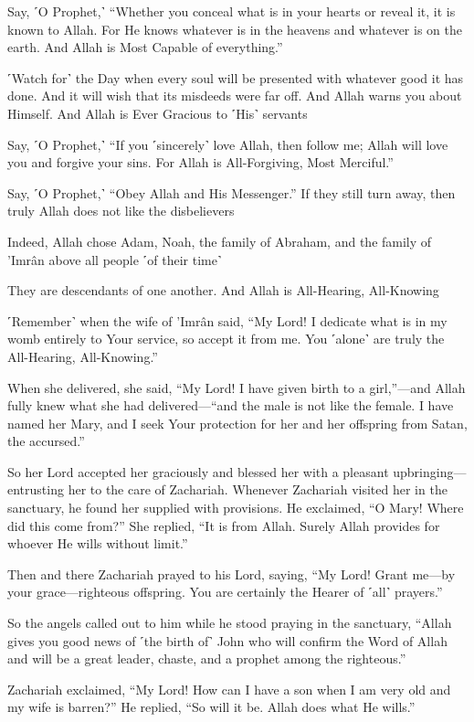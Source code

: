 Say, ˹O Prophet,˺ “Whether you conceal what is in your hearts or reveal it, it is known to Allah. For He knows whatever is in the heavens and whatever is on the earth. And Allah is Most Capable of everything.”

˹Watch for˺ the Day when every soul will be presented with whatever good it has done. And it will wish that its misdeeds were far off. And Allah warns you about Himself. And Allah is Ever Gracious to ˹His˺ servants

Say, ˹O Prophet,˺ “If you ˹sincerely˺ love Allah, then follow me; Allah will love you and forgive your sins. For Allah is All-Forgiving, Most Merciful.”

Say, ˹O Prophet,˺ “Obey Allah and His Messenger.” If they still turn away, then truly Allah does not like the disbelievers

Indeed, Allah chose Adam, Noah, the family of Abraham, and the family of ’Imrân above all people ˹of their time˺

They are descendants of one another. And Allah is All-Hearing, All-Knowing

˹Remember˺ when the wife of ’Imrân said, “My Lord! I dedicate what is in my womb entirely to Your service, so accept it from me. You ˹alone˺ are truly the All-Hearing, All-Knowing.”

When she delivered, she said, “My Lord! I have given birth to a girl,”—and Allah fully knew what she had delivered—“and the male is not like the female. I have named her Mary, and I seek Your protection for her and her offspring from Satan, the accursed.”

So her Lord accepted her graciously and blessed her with a pleasant upbringing—entrusting her to the care of Zachariah. Whenever Zachariah visited her in the sanctuary, he found her supplied with provisions. He exclaimed, “O Mary! Where did this come from?” She replied, “It is from Allah. Surely Allah provides for whoever He wills without limit.”

Then and there Zachariah prayed to his Lord, saying, “My Lord! Grant me—by your grace—righteous offspring. You are certainly the Hearer of ˹all˺ prayers.”

So the angels called out to him while he stood praying in the sanctuary, “Allah gives you good news of ˹the birth of˺ John who will confirm the Word of Allah and will be a great leader, chaste, and a prophet among the righteous.”

Zachariah exclaimed, “My Lord! How can I have a son when I am very old and my wife is barren?” He replied, “So will it be. Allah does what He wills.”

